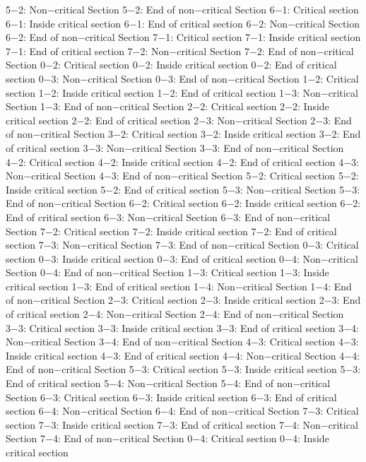 5−2: Non−critical Section
5−2: End of non−critical Section
6−1: Critical section
6−1: Inside critical section
6−1: End of critical section
6−2: Non−critical Section
6−2: End of non−critical Section
7−1: Critical section
7−1: Inside critical section
7−1: End of critical section
7−2: Non−critical Section
7−2: End of non−critical Section
0−2: Critical section
0−2: Inside critical section
0−2: End of critical section
0−3: Non−critical Section
0−3: End of non−critical Section
1−2: Critical section
1−2: Inside critical section
1−2: End of critical section
1−3: Non−critical Section
1−3: End of non−critical Section
2−2: Critical section
2−2: Inside critical section
2−2: End of critical section
2−3: Non−critical Section
2−3: End of non−critical Section
3−2: Critical section
3−2: Inside critical section
3−2: End of critical section
3−3: Non−critical Section
3−3: End of non−critical Section
4−2: Critical section
4−2: Inside critical section
4−2: End of critical section
4−3: Non−critical Section
4−3: End of non−critical Section
5−2: Critical section
5−2: Inside critical section
5−2: End of critical section
5−3: Non−critical Section
5−3: End of non−critical Section
6−2: Critical section
6−2: Inside critical section
6−2: End of critical section
6−3: Non−critical Section
6−3: End of non−critical Section
7−2: Critical section
7−2: Inside critical section
7−2: End of critical section
7−3: Non−critical Section
7−3: End of non−critical Section
0−3: Critical section
0−3: Inside critical section
0−3: End of critical section
0−4: Non−critical Section
0−4: End of non−critical Section
1−3: Critical section
1−3: Inside critical section
1−3: End of critical section
1−4: Non−critical Section
1−4: End of non−critical Section
2−3: Critical section
2−3: Inside critical section
2−3: End of critical section
2−4: Non−critical Section
2−4: End of non−critical Section
3−3: Critical section
3−3: Inside critical section
3−3: End of critical section
3−4: Non−critical Section
3−4: End of non−critical Section
4−3: Critical section
4−3: Inside critical section
4−3: End of critical section
4−4: Non−critical Section
4−4: End of non−critical Section
5−3: Critical section
5−3: Inside critical section
5−3: End of critical section
5−4: Non−critical Section
5−4: End of non−critical Section
6−3: Critical section
6−3: Inside critical section
6−3: End of critical section
6−4: Non−critical Section
6−4: End of non−critical Section
7−3: Critical section
7−3: Inside critical section
7−3: End of critical section
7−4: Non−critical Section
7−4: End of non−critical Section
0−4: Critical section
0−4: Inside critical section
